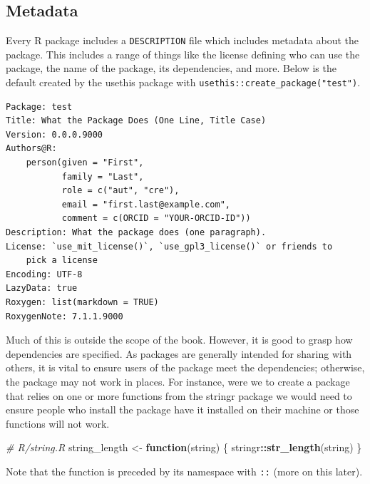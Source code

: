 \documentclass[
]{krantz}
\makeatletter
\newenvironment{Shaded}{\begin{snugshade}}{\end{snugshade}}
\newcommand{\CommentTok}[1]{\textcolor[rgb]{0.37,0.37,0.37}{\textit{#1}}}
\newcommand{\ControlFlowTok}[1]{\textcolor[rgb]{0.27,0.27,0.27}{\textbf{#1}}}
\newcommand{\KeywordTok}[1]{\textcolor[rgb]{0.27,0.27,0.27}{\textbf{#1}}}
\newcommand{\NormalTok}[1]{#1}
\newcommand{\OperatorTok}[1]{\textcolor[rgb]{0.43,0.43,0.43}{\textbf{#1}}}
\newcommand{\StringTok}[1]{\textcolor[rgb]{0.5,0.5,0.5}{#1}}
\newenvironment{kframe}{%
\medskip{}
\setlength{\fboxsep}{.8em}
 \def\at@end@of@kframe{}%
 \ifinner\ifhmode%
  \def\at@end@of@kframe{\end{minipage}}%
  \begin{minipage}{\columnwidth}%
 \fi\fi%
 \def\FrameCommand##1{\hskip\@totalleftmargin \hskip-\fboxsep
 \colorbox{shadecolor}{##1}\hskip-\fboxsep
     \hskip-\linewidth \hskip-\@totalleftmargin \hskip\columnwidth}%
 \MakeFramed {\advance\hsize-\width
   \@totalleftmargin\z@ \linewidth\hsize
   \@setminipage}}%
 {\par\unskip\endMakeFramed%
 \at@end@of@kframe}
\renewenvironment{Shaded}{\begin{kframe}}{\end{kframe}}
\newenvironment{rmdblock}[1]
  {
  \begin{itemize}
  \renewcommand{\labelitemi}{
    \raisebox{-.7\height}[0pt][0pt]{
      {\setkeys{Gin}{width=3em,keepaspectratio}\texttt{[image: images/\#1]}}
    }
  }
  \setlength{\fboxsep}{1em}
  \begin{kframe}
  \item
  }
  {
  \end{kframe}
  \end{itemize}
  }
\newenvironment{rmdnote}
  {\begin{rmdblock}{note}}
  {\end{rmdblock}}
\makeatother
\begin{document}
\hypertarget{basics-metadata}{%
\subsection{Metadata}\label{basics-metadata}}

Every R package includes a \texttt{DESCRIPTION} file which includes metadata about the package. This includes a range of things like the license defining who can use the package, the name of the package, its dependencies, and more. Below is the default created by the usethis package with \texttt{usethis::create\_package("test")}.

\begin{verbatim}
Package: test
Title: What the Package Does (One Line, Title Case)
Version: 0.0.0.9000
Authors@R: 
    person(given = "First",
           family = "Last",
           role = c("aut", "cre"),
           email = "first.last@example.com",
           comment = c(ORCID = "YOUR-ORCID-ID"))
Description: What the package does (one paragraph).
License: `use_mit_license()`, `use_gpl3_license()` or friends to
    pick a license
Encoding: UTF-8
LazyData: true
Roxygen: list(markdown = TRUE)
RoxygenNote: 7.1.1.9000
\end{verbatim}

Much of this is outside the scope of the book. However, it is good to grasp how dependencies are specified. As packages are generally intended for sharing with others, it is vital to ensure users of the package meet the dependencies; otherwise, the package may not work in places. For instance, were we to create a package that relies on one or more functions from the stringr \citep{R-stringr} package we would need to ensure people who install the package have it installed on their machine or those functions will not work.

\begin{Shaded}
\begin{Highlighting}[]
\CommentTok{\# R/string.R}
\NormalTok{string\_length <{-}}\StringTok{ }\ControlFlowTok{function}\NormalTok{(string) \{}
\NormalTok{  stringr}\OperatorTok{::}\KeywordTok{str\_length}\NormalTok{(string)}
\NormalTok{\}}
\end{Highlighting}
\end{Shaded}

\begin{rmdnote}
Note that the function is preceded by its namespace with \texttt{::}
(more on this later).
\end{rmdnote}
\end{document}
